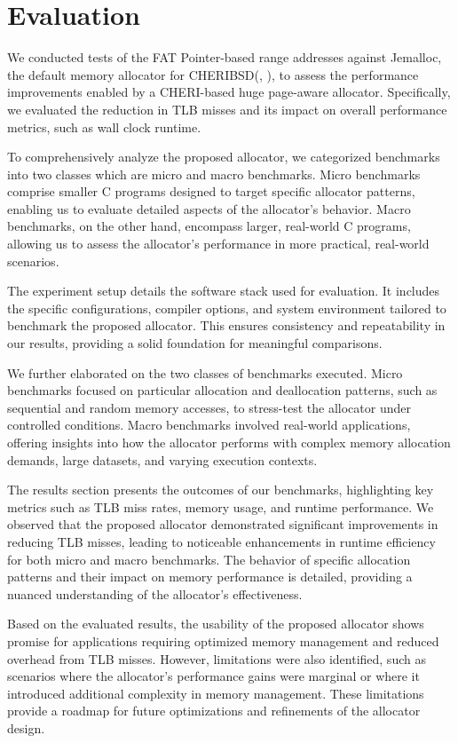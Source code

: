 \documentclass[11pt]{article}
\author{Akilan}
\date{\today}
\title{}
\begin{document}
\tableofcontents

\section{Evaluation}
\label{sec:org02aba25}

We conducted tests of the FAT Pointer-based range addresses against Jemalloc, 
the default memory allocator for CHERIBSD(, ), to assess the performance improvements 
enabled by a CHERI-based huge page-aware allocator. Specifically, we evaluated 
the reduction in TLB misses and its impact on overall 
performance metrics, such as wall clock runtime.

To comprehensively analyze the proposed allocator, we categorized benchmarks into 
two classes which are micro and macro benchmarks. Micro benchmarks comprise smaller 
C programs designed to target specific allocator patterns, enabling us to evaluate 
detailed aspects of the allocator's behavior. Macro benchmarks, on the other hand, 
encompass larger, real-world C programs, allowing us to assess the allocator's 
performance in more practical, real-world scenarios.

The experiment setup details the software stack used for evaluation. It includes 
the specific configurations, compiler options, and system environment tailored 
to benchmark the proposed allocator. This ensures consistency and repeatability 
in our results, providing a solid foundation for meaningful comparisons.

We further elaborated on the two classes of benchmarks executed. Micro benchmarks 
focused on particular allocation and deallocation patterns, such as sequential and 
random memory accesses, to stress-test the allocator under controlled conditions. 
Macro benchmarks involved real-world applications, offering insights into how 
the allocator performs with complex memory allocation demands, large datasets, 
and varying execution contexts.

The results section presents the outcomes of our benchmarks, highlighting key metrics 
such as TLB miss rates, memory usage, and runtime performance. We observed that the 
proposed allocator demonstrated significant improvements in reducing TLB misses, 
leading to noticeable enhancements in runtime efficiency for both micro and macro 
benchmarks. The behavior of specific allocation patterns and their impact on memory 
performance is detailed, providing a nuanced understanding of the allocator's effectiveness.

Based on the evaluated results, the usability of the proposed allocator shows promise 
for applications requiring optimized memory management and reduced overhead from TLB misses.
However, limitations were also identified, such as scenarios where the allocator's performance 
gains were marginal or where it introduced additional complexity in memory management. These 
limitations provide a roadmap for future optimizations and refinements of the allocator design.
\end{document}
